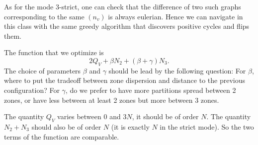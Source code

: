 \documentclass[]{article}
\begin{document}
As for the mode 3-strict, one can check that the difference of two such graphs corresponding to the same $(n_v)$ is always eulerian. Hence we can navigate in this class with the same greedy algorithm that discovers positive cycles and flips them.

The function that we optimize is 
$$
2Q_V +  \beta N_2 + (\beta+\gamma) N_3.
$$
The choice of parameters $\beta$ and $\gamma$ should be lead by the following question: For $\beta$, where to put the tradeoff between zone dispersion and distance to the previous configuration? For $\gamma$, do we prefer to have more partitions spread between 2 zones, or have less between at least 2 zones but more between 3 zones.

The quantity $Q_V$ varies between $0$ and $3N$, it should be of order $N$. The quantity $N_2+N_3$ should also be of order $N$ (it is exactly $N$ in the strict mode). So the two terms of the function are comparable. 
\end{document}
